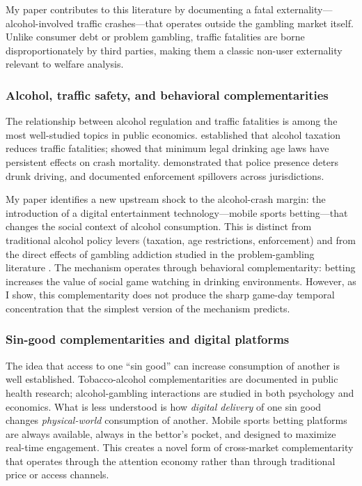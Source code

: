 \documentclass[12pt]{article}
\begin{document}
My paper contributes to this literature by documenting a fatal externality---alcohol-involved traffic crashes---that operates outside the gambling market itself. Unlike consumer debt or problem gambling, traffic fatalities are borne disproportionately by third parties, making them a classic non-user externality relevant to welfare analysis.

\subsubsection*{Alcohol, traffic safety, and behavioral complementarities} The relationship between alcohol regulation and traffic fatalities is among the most well-studied topics in public economics. \citet{CookMoore1993} established that alcohol taxation reduces traffic fatalities; \citet{CarpenterDobkin2011} showed that minimum legal drinking age laws have persistent effects on crash mortality. \citet{DeAngelo2017} demonstrated that police presence deters drunk driving, and \citet{HansenWaddell2018} documented enforcement spillovers across jurisdictions.

My paper identifies a new upstream shock to the alcohol-crash margin: the introduction of a digital entertainment technology---mobile sports betting---that changes the social context of alcohol consumption. This is distinct from traditional alcohol policy levers (taxation, age restrictions, enforcement) and from the direct effects of gambling addiction studied in the problem-gambling literature \citep{Grinols2004, WalkerBarnett1999}. The mechanism operates through behavioral complementarity: betting increases the value of social game watching in drinking environments. However, as I show, this complementarity does not produce the sharp game-day temporal concentration that the simplest version of the mechanism predicts.

\subsubsection*{Sin-good complementarities and digital platforms} The idea that access to one ``sin good'' can increase consumption of another is well established. Tobacco-alcohol complementarities are documented in public health research; alcohol-gambling interactions are studied in both psychology and economics. What is less understood is how \textit{digital delivery} of one sin good changes \textit{physical-world} consumption of another. Mobile sports betting platforms are always available, always in the bettor's pocket, and designed to maximize real-time engagement. This creates a novel form of cross-market complementarity that operates through the attention economy rather than through traditional price or access channels.
\end{document}
